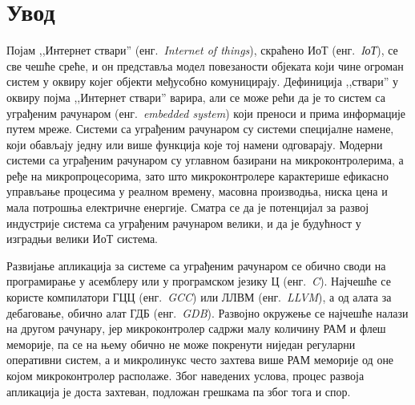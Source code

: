 \documentclass[12pt,oneside]{memoir}
\begin{document}
\frontmatter
\naslovna
\komisija
\apstrakt
\tableofcontents*

\mainmatter

\chapter{Увод}
Појам ,,Интернет ствари'' (енг.~\textit{Internet of things}), скраћено ИоТ (енг.~\textit{IоТ}), се све чешће среће, и он представља модел повезаности објеката који чине огроман систем у оквиру којег објекти међусобно комуницирају. Дефиниција ,,ствари'' у оквиру појма ,,Интернет ствари'' варира, али се може рећи да је то систем са уграђеним рачунаром (енг.~\textit{embedded system}) који преноси и прима информације путем мреже. Системи са уграђеним рачунаром су системи специјалне намене, који обављају једну или више функција које тој намени одговарају. Модерни системи са уграђеним рачунаром су углавном базирани на микроконтролерима, а ређе на микропроцесорима, зато што микроконтролере карактерише ефикасно управљање процесима у реалном времену, масовна производња, ниска цена и мала потрошња електричне енергије. Сматра се да је потенцијал за развој индустрије система са уграђеним рачунаром велики, и да је будућност у изградњи велики ИоТ система.

Развијање апликација за системе са уграђеним рачунаром се обично своди на програмирање у асемблеру или у програмском језику Ц (енг.~\textit{C}). Најчешће се користе компилатори ГЦЦ (енг.~\textit{GCC}) или ЛЛВМ (енг.~\textit{LLVM}), а од алата за дебаговање, обично алат ГДБ (енг.~\textit{GDB}). Развојно окружење се најчешће налази на другом рачунару, јер микроконтролер садржи малу количину РАМ и флеш меморије, па се на  њему обично не може покренути ниједан регуларни оперативни систем, а и микролинукс често захтева више РАМ меморије од оне којом микроконтролер располаже. Због наведених услова, процес развоја апликација је доста захтеван, подложан грешкама па због тога и спор.
\end{document}
